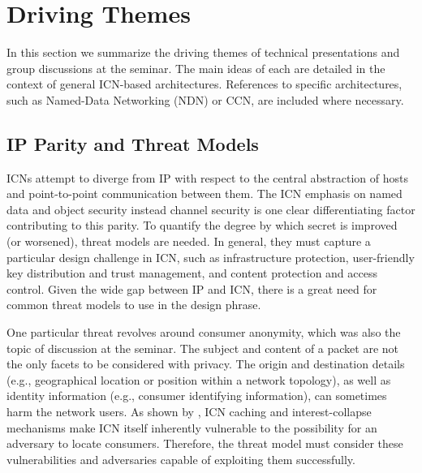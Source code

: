 \section{Driving Themes} \label{sec:themes}
In this section we summarize the driving themes of technical presentations and
group discussions at the seminar. The main ideas of each are detailed in the context
of general ICN-based architectures. References to specific architectures, such as
Named-Data Networking (NDN) or CCN, are included where necessary.

\subsection{IP Parity and Threat Models}
ICNs attempt to diverge from IP with respect
to the central abstraction of hosts and point-to-point communication between
them. The ICN emphasis on named data and object security instead channel security
is one clear differentiating factor contributing to this parity. To quantify
the degree by which secret is improved (or worsened), threat models are needed.
In general, they must capture a particular design challenge in ICN, such as
infrastructure protection, user-friendly key distribution and trust management, and
content protection and access control.  Given the wide gap between IP and ICN,
there is a great need for common threat models to use in the design phrase.

One particular threat revolves around consumer anonymity, which was also
the topic of discussion at the seminar. The subject and content
of a packet are not the only facets to be considered with privacy.
The origin and destination details (e.g., geographical location or position within a network
topology), as well as identity information (e.g., consumer identifying information),
can sometimes harm the network users. As shown by \cite{compagno2015violating}, ICN caching and
interest-collapse mechanisms make ICN itself inherently vulnerable to the possibility for an
adversary to locate consumers. Therefore, the threat model must consider these vulnerabilities
and adversaries capable of exploiting them successfully.

